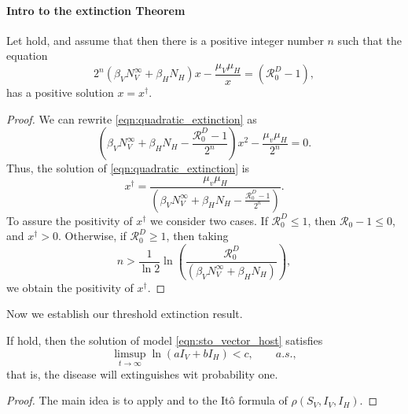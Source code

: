 \paragraph{Intro to the extinction Theorem}
\begin{lemma}
    Let  hold, 
    and assume that 
    then there is a positive integer number $n$
    such that the equation
    \begin{equation}\label{eqn:quadratic_extinction}
        2^n
        \left(
            \beta_V N_V^{\infty} +
            \beta_H N_H
        \right) x
        - \frac{\mu_V \mu_H}{x}
        =
        \left(
            \mathcal{R}_0^D -1
        \right),
    \end{equation}
    has a positive solution $x=x^\dagger$. 
\end{lemma}
\begin{proof}
    We can rewrite \eqref{eqn:quadratic_extinction} as
    \begin{equation*}
        \left(
            \beta_V N_V ^ {\infty} +
            \beta_H N_H            
            -\frac{\mathcal{R}_0 ^ D - 1}{2 ^ n}
        \right) x ^ 2
        - \frac{\mu_v \mu_H}{2 ^ n}
        = 0.
    \end{equation*}
    Thus, the solution of \eqref{eqn:quadratic_extinction} is
    $$
        x^{\dagger} = 
            \frac{\mu_v \mu_H}{
                \left(
                    \beta_V N_V ^ {\infty} +
                    \beta_H N_H            
                    -\frac{\mathcal{R}_0 ^ D - 1}{2 ^ n}
                \right)
            }.
    $$
    To assure the positivity of $x^{\dagger}$ we consider two cases.
    If $\mathcal{R}_0 ^ D \leq 1$, 
    then $\mathcal{R}_0 - 1 \leq 0$, and $x^{\dagger} >0$.
    Otherwise, if $\mathcal{R}_0 ^ D \geq 1$,
    then taking 
    $$          
        n > \frac{1}{\ln 2} 
            \ln
            \left(
                \displaystyle
                \frac{\mathcal{R}_0 ^ D}{
                    \left(
                        \beta_V N_V ^ {\infty} +
                        \beta_H N_H
                    \right)
                }    
            \right),
    $$
    we obtain the positivity of $x^{\dagger}$.
\end{proof}
%
%
%
Now we establish our threshold extinction result.
\begin{theorem}
    If  hold, then the solution of model 
    \eqref{eqn:sto_vector_host} satisfies
    \begin{equation}
        \limsup_{t \to \infty}
            \ln(aI_V + b I_H) < c , \qquad a.s.,
    \end{equation}
    that is, the disease will extinguishes wit probability one.
\end{theorem}
%
%
\begin{proof}
    The main idea is to apply  and 
     to the It\^{o} formula of $\rho(S_V, I_V, I_H)$.
\end{proof}
